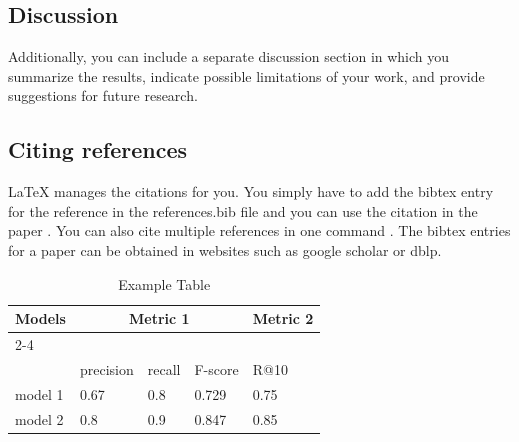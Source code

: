 \documentclass{article}
\begin{document}
\subsection{Discussion}
Additionally, you can include a separate discussion section in which you summarize the results, indicate possible limitations of your work, and provide suggestions for future research.

\subsection{Citing references}
LaTeX manages the citations for you. You simply have to add the bibtex entry for the reference in the references.bib file and you can use the citation in the paper \cite{langley00}. You can also cite multiple references in one command \cite{DudaHart2nd,Newell81,kearns89}. The bibtex entries for a paper can be obtained in websites such as google scholar or dblp.

\begin{table}[h]
    \centering
    \caption{Example Table}
    \label{tab:example-table}
    \begin{tabular}{lllll}
        \toprule
        \multirow{2}{*}{Models} & \multicolumn{3}{c}{Metric 1} & Metric 2\\
        \cmidrule{2-4} \cmidrule{5-5} \\
        {} & precision & recall & F-score  & R@10 \\
        \midrule
        model 1 & 0.67  & 0.8 & 0.729  & 0.75 \\
        model 2 & 0.8 & 0.9 & 0.847 & 0.85 \\
        \bottomrule
    \end{tabular}
\end{table}



\end{document}
